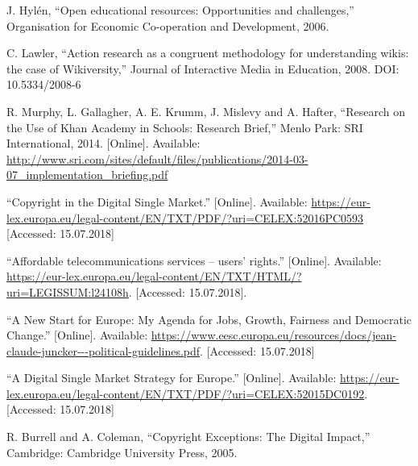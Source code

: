 \documentclass[a4paper]{article}
\begin{document}
\begin{thebibliography}{}
 J. Hylén, ``Open educational resources: Opportunities and challenges,'' Organisation for Economic Co-operation and Development, 2006.

 C. Lawler, ``Action research as a congruent methodology for understanding wikis: the case of Wikiversity,'' Journal of Interactive Media in Education, 2008. DOI: 10.5334/2008-6

 R. Murphy, L. Gallagher, A. E. Krumm, J. Mislevy and A. Hafter, ``Research on the Use of Khan Academy in Schools: Research Brief,'' Menlo Park: SRI International, 2014. [Online]. Available: \url{http://www.sri.com/sites/default/files/publications/2014-03-07_implementation_briefing.pdf}

 ``Copyright in the Digital Single Market.'' [Online]. Available: \url{https://eur-lex.europa.eu/legal-content/EN/TXT/PDF/?uri=CELEX:52016PC0593} [Accessed: 15.07.2018]

 ``Affordable telecommunications services -- users' rights.'' [Online]. Available: \url{https://eur-lex.europa.eu/legal-content/EN/TXT/HTML/?uri=LEGISSUM:l24108h}. [Accessed: 15.07.2018].

 ``A New Start for Europe: My Agenda for Jobs, Growth, Fairness and Democratic Change.'' [Online]. Available: \url{https://www.eesc.europa.eu/resources/docs/jean-claude-juncker---political-guidelines.pdf}. [Accessed: 15.07.2018]

 ``A Digital Single Market Strategy for Europe.'' [Online]. Available: \url{https://eur-lex.europa.eu/legal-content/EN/TXT/PDF/?uri=CELEX:52015DC0192}. [Accessed: 15.07.2018]

 R. Burrell and A. Coleman, ``Copyright Exceptions: The Digital Impact,'' Cambridge: Cambridge University Press, 2005.

\end{thebibliography}
\end{document}
